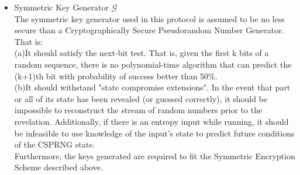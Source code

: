 \begin{itemize}
\item Symmetric Key Generator $\mathcal{G}$\\
The symmetric key generator used in this protocol is assumed to be no less secure than a Cryptographically Secure Pseudorandom Number Generator. That is: \\
(a)It should satisfy the next-bit test. That is, given the first k bits of a random sequence, there is no polynomial-time algorithm that can predict the (k+1)th bit with probability of success better than 50\%. \cite{Yao}\\
(b)It should withstand "state compromise extensions". In the event that part or all of its state has been revealed (or guessed correctly), it should be impossible to reconstruct the stream of random numbers prior to the revelation. Additionally, if there is an entropy input while running, it should be infeasible to use knowledge of the input's state to predict future conditions of the CSPRNG state.\\
Furthermore, the keys generated are required to fit the Symmetric Encryption Scheme described above.
\\
\end{itemize}

